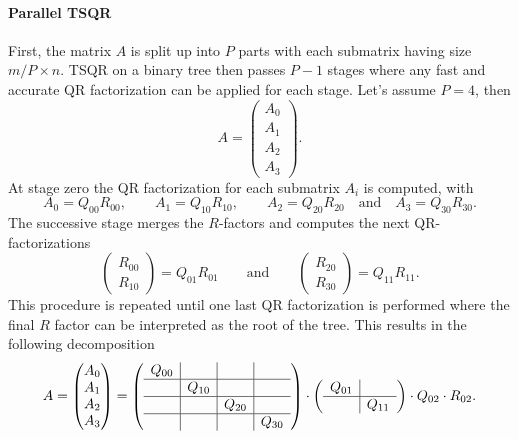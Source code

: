 \documentclass{scrartcl}
\numberwithin{equation}{section}
\begin{document}
\paragraph{Parallel TSQR} First, the matrix $A$ is split up into $P$ parts with each submatrix having size $m/P \times n$. TSQR on a binary tree then passes $P - 1$ stages where any fast and accurate QR factorization can be applied for each stage. Let's assume $P = 4$, then 
\begin{equation*}
A =
\begin{pmatrix}
A_0\\A_1\\A_2\\A_3
\end{pmatrix}.
\end{equation*}
At stage zero the QR factorization for each submatrix $A_i$ is computed, with
\begin{equation*}
A_0 = Q_{00}R_{00}, \qquad A_1 = Q_{10}R_{10}, \qquad A_2 = Q_{20}R_{20} \quad \text{and} \quad A_3 = Q_{30}R_{30}.
\end{equation*}
The successive stage merges the $R$-factors and computes the next QR-factorizations
\begin{equation*}
\begin{pmatrix}
R_{00} \\
R_{10}
\end{pmatrix} =
Q_{01}R_{01} \qquad \text{and} \qquad
\begin{pmatrix}
R_{20} \\
R_{30}
\end{pmatrix} = 
Q_{11}R_{11}.
\end{equation*}
This procedure is repeated until one last QR factorization is performed where the final $R$ factor can be interpreted as the root of the tree. This results in the following decomposition
\begin{equation} \label{eq:tsqr}
A =
\begin{pmatrix}
A_0\\A_1\\A_2\\A_3
\end{pmatrix} =
\left(
	\begin{array}{c|c|c|c}
	Q_{00} & & & \\
	\hline
	& Q_{10} & & \\
	\hline
	& & Q_{20} & \\
	\hline
	& & & Q_{30}
	\end{array}
	\right) \cdot
\left(
	\begin{array}{c|c}
		Q_{01} & \\
		\hline
		& Q_{11} 
	\end{array}
\right) \cdot
Q_{02} \cdot R_{02}.
\end{equation}
\end{document}
